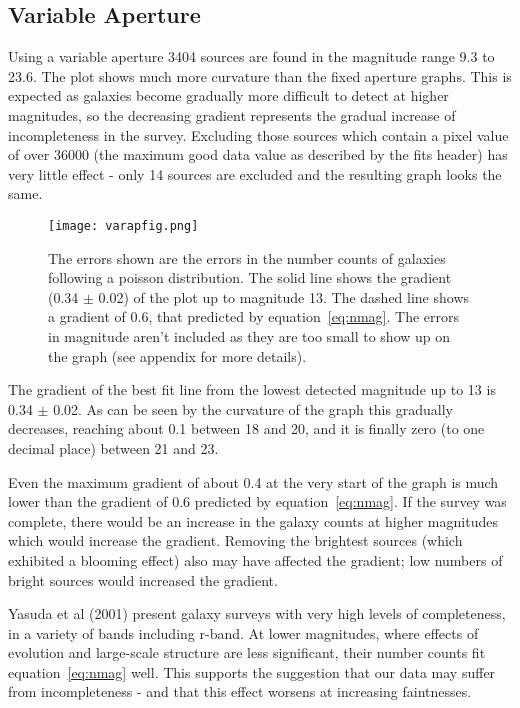 \documentclass[a4paper,11pt,twoside]{article}
\begin{document}
\newpage
\subsection{Variable Aperture}

Using a variable aperture 3404 sources are found in the
magnitude range 9.3 to 23.6.
The plot shows much more curvature 
than the fixed aperture graphs. This is expected as galaxies 
become gradually more difficult to detect at higher magnitudes, 
so the decreasing gradient represents the gradual increase of 
incompleteness in the survey. Excluding those sources which 
contain a pixel value of over 36000 (the maximum good data 
value as described by the fits header) has very little 
effect - only 14 sources are excluded and the resulting graph 
looks the same.

\begin{figure}[htb]
  \centering
  \texttt{[image: varapfig.png]}
  \caption{The errors shown are the errors in the number 
counts of galaxies following a poisson distribution. The solid line
shows the gradient (0.34 \(\pm\) 0.02) of the plot up to 
magnitude 13. The dashed line shows a gradient of 0.6, that 
predicted by equation~\ref{eq:nmag}. 
The errors in magnitude aren't included as 
they are too small to show up on the graph 
(see appendix for more details).}
  \label{fig:varapfig}
\end{figure}


The gradient of the best fit line from the lowest detected 
magnitude up to 13 is 0.34 \(\pm\) 0.02. 
As can be seen by the curvature of the 
graph this gradually decreases, reaching about 0.1 between 
18 and 20, and it is finally zero (to one decimal place) 
between 21 and 23. 

Even the maximum gradient of about 0.4 at the very start 
of the graph is much lower than the gradient of 0.6 
predicted by equation~\ref{eq:nmag}. If the survey was complete, 
there would be an increase in the galaxy counts at higher magnitudes 
which would increase the gradient. Removing the brightest 
sources (which exhibited a blooming effect) also may have 
affected the gradient; low numbers of bright sources would  
increased the gradient.

Yasuda\cite{yasuda} et al (2001) present galaxy surveys with 
very high levels of completeness, in a variety of bands including 
r-band. At lower magnitudes, where effects of evolution and 
large-scale structure are less significant, their number 
counts fit equation~\ref{eq:nmag} well. This supports the suggestion 
that our data may suffer from incompleteness - and that this 
effect worsens at increasing faintnesses. 
\end{document}
